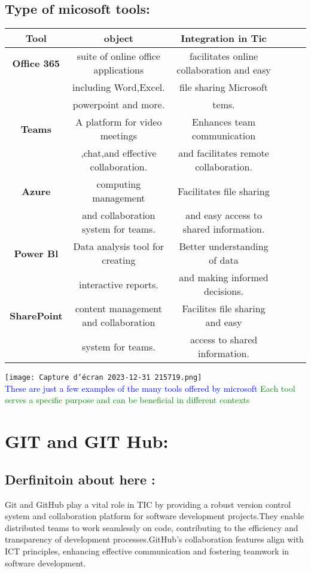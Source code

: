 \documentclass[a4paper,11pt]{report}
\begin{document}
\section{Type of micosoft tools:}
\begin{table}[!h]
    \centering
    \begin{tabular}{|c|c|c|c|c|c|}
    \hline
    \textbf{Tool}& \textbf{object}&\textbf{Integration in Tic}\\
    \hline
    \textbf{Office 365}&suite of online office applications& facilitates online collaboration and easy  \\
    &including Word,Excel.&file sharing Microsoft \\
    &powerpoint and more.&tems.\\
    \hline
   \textbf{Teams}&A platform for video meetings&Enhances team communication  \\
   &,chat,and effective collaboration.& and facilitates remote collaboration.\\
    \hline
    \textbf{Azure} &computing management &Facilitates file sharing \\
    & and collaboration system for teams. &and easy access to shared information. \\
    \hline
    \textbf{Power Bl}&Data analysis tool for creating  & Better understanding of data \\
    & interactive reports.&and making informed decisions.\\
    \hline
    \textbf{SharePoint}& content management and collaboration & Facilites file sharing and easy \\
    & system for teams.&access to shared information.\\
    \hline
    
    \end{tabular}   
    \label{tab:my_label}
\end{table}
\texttt{[image: Capture d’écran 2023-12-31 215719.png]}\\


\textcolor{blue}{These are just a few examples of the many tools offered by microsoft}
\textcolor{green}{Each tool serves a specific purpose and can be beneficial in different contexts}

\clearpage
\chapter{GIT and GIT Hub:}
\section{Derfinitoin about here :}
Git and GitHub play a vital role in TIC by providing a robust version control system and collaboration platform for software development projects.They enable distributed teams to work seamlessly on code, contributing to the efficiency and transparency of development processes.GitHub's collaboration features align with ICT principles, enhancing effective communication and fostering teamwork in software development.
\end{document}
